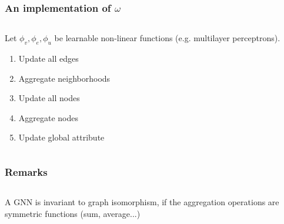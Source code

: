 \documentclass{beamer}
\begin{document}
\begin{frame}[t]
\frametitle{An implementation of $\omega$}


\begin{columns}[T]
\begin{column}{.5\textwidth}

\begin{block}{}
Let $\phi_v, \phi_e, \phi_u$ be learnable non-linear functions (e.g. multilayer perceptrons).
\begin{enumerate}[<+->]
\item Update all edges
\item Aggregate neighborhoods
\item Update all nodes
\item Aggregate nodes
\item Update global attribute
\end{enumerate}
\end{block}
\end{column}

\begin{column}{.5\textwidth}
\begin{block}{}
\end{block}
\end{column}
\end{columns}
\end{frame}

\begin{frame}
\frametitle{Remarks}
\begin{columns}[t]
\begin{column}{.4\textwidth}
A GNN is invariant to graph isomorphism, if the aggregation operations are symmetric functions (sum, average...) 
\end{column}
\begin{column}{.6\textwidth}
\centering {} 
\end{column}
\end{columns}
\end{frame}
\end{document}
